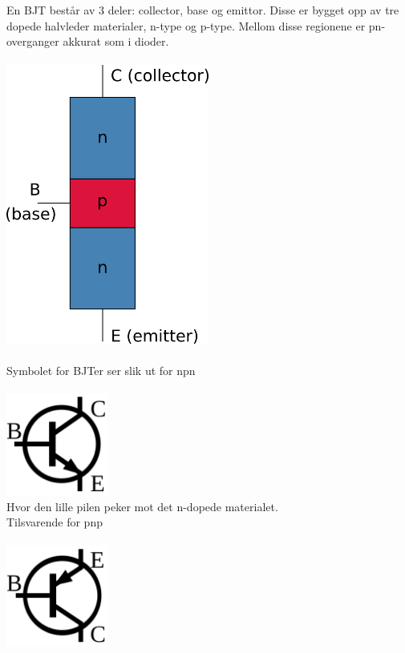 En BJT består av 3 deler: collector, base og emittor.
Disse er bygget opp av tre dopede halvleder materialer, n-type og p-type.
Mellom disse regionene er pn-overganger akkurat som i dioder. \\\\
\includegraphics[width=0.5\textwidth]{./img/npn}
\\\\
Symbolet for BJTer ser slik ut for npn \\\\
\includegraphics[width=0.25\textwidth]{./img/npn-symbol} \\
Hvor den lille pilen peker mot det n-dopede materialet.
\\
Tilsvarende for pnp \\\\
\includegraphics[width=0.25\textwidth]{./img/pnp-symbol}

